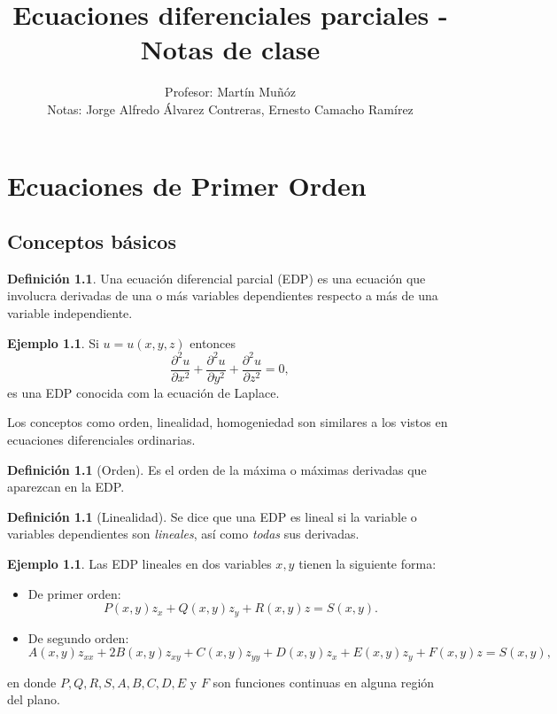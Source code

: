 \documentclass[11pt,letterpaper,draft]{report}
\title{Ecuaciones diferenciales parciales - Notas de clase}
\author{Profesor: Martín Muñóz \\
Notas: Jorge Alfredo Álvarez Contreras, Ernesto Camacho Ramírez}
\theoremstyle{plain}
\theoremstyle{definition}
\newtheorem{definition}[theorem]{Definición}
\newtheorem{example}[theorem]{Ejemplo}
\theoremstyle{remark}
\newcommand\<{\langle}
\renewcommand\>{\rangle}
\begin{document}
\maketitle

\tableofcontents
\listoftodos

\chapter{Ecuaciones de Primer Orden}

\section{Conceptos básicos}

\begin{definition}
  Una ecuación diferencial parcial (EDP) es una ecuación 
  que involucra derivadas de una o más variables dependientes 
  respecto a más de una variable independiente.
\end{definition}

\begin{example}
  Si $u = u(x,y,z)$ entonces
  \[
  \frac{\partial^2 u}{\partial x^2} + \frac{\partial^2 u}{\partial y^2} + \frac{\partial^2 u}{\partial z^2} = 0,
  \] es una EDP conocida com la ecuación de Laplace.
\end{example}

Los conceptos como orden, linealidad, homogeniedad son
similares a los vistos en ecuaciones diferenciales
ordinarias.

\begin{definition}[Orden]
  Es el orden de la máxima o máximas derivadas que aparezcan
  en la EDP.
\end{definition}

\begin{definition}[Linealidad]
  Se dice que una EDP es lineal si la variable o variables
  dependientes son \textit{lineales}, así como \textit{todas} sus
  derivadas.
\end{definition}

\begin{example}
  Las EDP lineales en dos variables \(x,y\) tienen la siguiente forma:
  \begin{itemize}
    \item
      De primer orden:
      \[
        P(x,y) z_x + Q(x,y) z_y + R(x,y) z = S(x,y).
      \] 
    \item 
      De segundo orden:
      \[
        A(x,y) z_{xx} + 2B(x,y) z_{xy} + C(x,y) z_{yy} + D(x,y)
      z_x + E(x,y) z_y + F(x,y) z = S(x,y), \]
  \end{itemize}
  en donde $P,Q,R,S,A,B,C,D,E$ y $F$ son funciones
  continuas en alguna región del plano.
\end{example}
\end{document}
